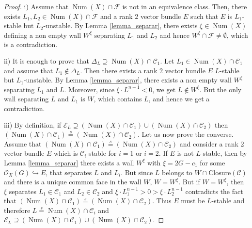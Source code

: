 \documentclass[11pt,twoside]{amsart}
\theoremstyle{definition}
\newcommand {\Closure}{\mathrm{Closure}}
\newcommand{\Num}{\operatorname{Num}}
\begin{document}
\begin{proof}
    i) Assume that $\Num(X)\cap\mathcal{F}$ is not in an equivalence class. Then, there exists $L_1,L_2\in\Num(X)\cap\mathcal{F}$ and a rank 2 vector bundle $E$ such that $E$ is $L_1$-stable but $L_2$-unstable. By Lemma \ref{lemma_separar}, there exists $\xi\in\Num(X)$ defining a non empty wall $W^{\xi}$ %
    separating $L_1$ and $L_2$ and hence $W^{\xi}\cap \mathcal{F}\neq\emptyset$, which is a contradiction.

    ii) It is enough to prove that $\Delta_L\supseteq \Num(X)\cap\mathcal{C}_1$. Let $L_1\in \Num(X)\cap\mathcal{C}_1$ and assume that $L_1\not\in \Delta_L$. Then there exists  a rank 2 vector bundle $E$ $L$-stable but $L_1$-unstable. By Lemma \ref{lemma_separar}, there exists a non empty wall $W^{\xi}$ separating $L_1$ and $L$. Moreover, since $\xi\cdot L^{n-1}<0$, we get $L\not\in W^{\xi}$. But the only wall separating $L$ and $L_1$ is $W$, which contains $L$, and hence we get a contradiction. 

    iii) By definition, if $\mathcal{E}_L\supseteq (\Num(X)\cap\mathcal{C}_1)\cup (\Num(X)\cap\mathcal{C}_2)$ then $(\Num(X)\cap\mathcal{C}_1)\overset{s}{=} (\Num(X)\cap\mathcal{C}_2)$. Let us now prove the converse. %
    Assume that $(\Num(X)\cap\mathcal{C}_1)\overset{s}{=} (\Num(X)\cap\mathcal{C}_2)$ and consider a rank 2 vector bundle $E$ which is $\mathcal{C}_i$-stable for $i=1$ or $i=2$. If $E$ is not $L$-stable, then by Lemma \ref{lemma_separar} there exists a wall $W^{\xi}$ with $\xi=2G-c_1$ for some $\mathcal{O}_X(G)\hookrightarrow E$, that separates $L$ and $L_i$. %
     But since $L$ belongs to $W\cap \Closure(\mathcal{C})$ and there is a unique common face in the wall $W$, $W=W^{\xi}$.
    But if $W=W^{\xi}$, then $\xi$ separates $L_1\in\mathcal{C}_1$ and $L_2\in\mathcal{C}_2$ and $\xi \cdot L_1^{n-1}>0>\xi\cdot L_2^{n-1}$ contradicts the fact that $(\Num(X)\cap\mathcal{C}_1)\overset{s}{=} (\Num(X)\cap\mathcal{C}_2)$. Thus $E$ must be $L$-stable and therefore $L\overset{s}{=}\Num(X)\cap \mathcal{C}_i$ and $\mathcal{E}_L\supseteq (\Num(X)\cap\mathcal{C}_1)\cup (\Num(X)\cap\mathcal{C}_2)$.
\end{proof}
\end{document}
